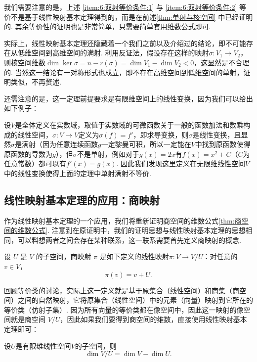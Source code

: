 我们需要注意的是，上述 \ref*{item:6:双射等价条件:1} 与 \ref*{item:6:双射等价条件:2} 等价不是基于线性映射基本定理得到的，而是在前述\autoref{thm:单射与核空间} 中已经证明的. 其余等价性的证明也是非常简单，只需要简单套用维数公式即可.

实际上，线性映射基本定理还隐藏着一个我们之前以及介绍过的结论，即不可能存在从低维空间到高维空间的满射. 利用反证法，假设存在这样的映射$\sigma:V_1\to V_2$，则核空间维数$\dim\ker\sigma=n-r(\sigma)=\dim V_1-\dim V_2<0$，这显然是不合理的. 当然这一结论有一对称形式也成立，即不存在高维空间到低维空间的单射，证明类似，不再赘述.

还需注意的是，这一定理前提要求是有限维空间上的线性变换，因为我们可以给出如下例子：

\begin{example}{}{}
    设$V$是全体定义在实数域，取值于实数域的可微函数关于一般的函数加法和数乘构成的线性空间，$\sigma:V\to V$定义为$\sigma(f)=f'$，即求导变换，则$\sigma$是线性变换，且显然$\sigma$是满射（因为任意连续函数$g$一定黎曼可积，所以一定能在$V$中找到原函数使得原函数的导数为$g$），但$\sigma$不是单射，例如对于$g(x)=2x$有$f(x)=x^2+C$（$C$为任意常数）都可以有$f'(x)=g(x)$. 因此我们发现这里定义在无限维线性空间$V$中的线性变换使得上面的定理中单射满射不等价.
\end{example}

\subsection{线性映射基本定理的应用：商映射}

作为线性映射基本定理的一个应用，我们将重新证明商空间的维数公式\autoref{thm:商空间的维数公式}. 注意到在原证明中，我们的证明思想与线性映射基本定理的思想相同，可以料想两者之间会存在某种联系，这一联系需要首先定义商映射的概念.

\begin{definition}{}{}
    设 $U$ 是 $V$ 的子空间，商映射 $\pi$ 是如下定义的线性映射$\pi : V \to V/U$：对任意的 $v \in V$，
    \[\pi(v) = v + U.\]
\end{definition}

回顾等价类的讨论，实际上这一定义就是基于原集合（线性空间）和商集（商空间）之间的自然映射，它将原集合（线性空间）中的元素（向量）映射到它所在的等价类（仿射子集）. 因为所有向量的等价类都在像空间中，因此这一映射的像空间就是商空间 $V/U$，因此如果我们要得到商空间的维数，直接使用线性映射基本定理即可：

\begin{theorem}{}{}
    设$U$是有限维线性空间$V$的子空间，则
    \[\dim V/U=\dim V-\dim U.\]
\end{theorem}

